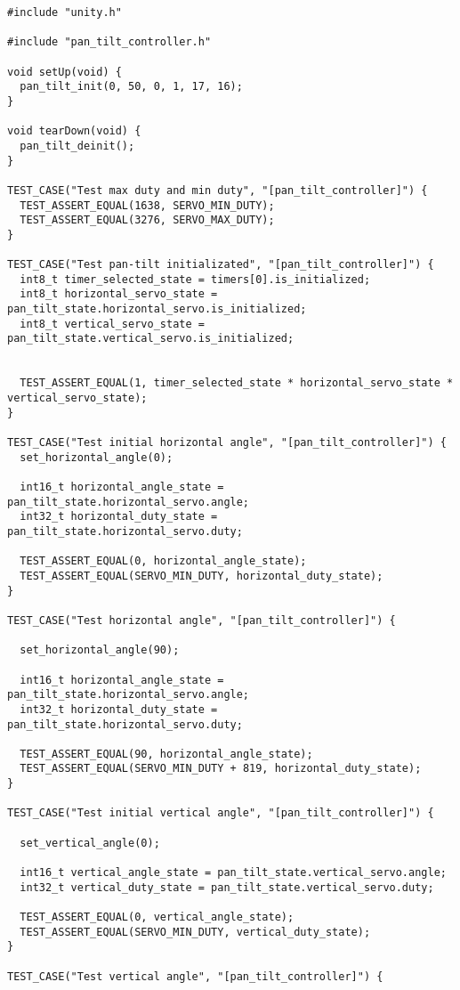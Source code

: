 \begin{lstlisting}
#include "unity.h"

#include "pan_tilt_controller.h"

void setUp(void) {
  pan_tilt_init(0, 50, 0, 1, 17, 16);
}

void tearDown(void) {
  pan_tilt_deinit();
}

TEST_CASE("Test max duty and min duty", "[pan_tilt_controller]") {
  TEST_ASSERT_EQUAL(1638, SERVO_MIN_DUTY);
  TEST_ASSERT_EQUAL(3276, SERVO_MAX_DUTY);
}

TEST_CASE("Test pan-tilt initializated", "[pan_tilt_controller]") {
  int8_t timer_selected_state = timers[0].is_initialized;
  int8_t horizontal_servo_state = pan_tilt_state.horizontal_servo.is_initialized;
  int8_t vertical_servo_state = pan_tilt_state.vertical_servo.is_initialized;


  TEST_ASSERT_EQUAL(1, timer_selected_state * horizontal_servo_state * vertical_servo_state);
}

TEST_CASE("Test initial horizontal angle", "[pan_tilt_controller]") {
  set_horizontal_angle(0);

  int16_t horizontal_angle_state = pan_tilt_state.horizontal_servo.angle;
  int32_t horizontal_duty_state = pan_tilt_state.horizontal_servo.duty;

  TEST_ASSERT_EQUAL(0, horizontal_angle_state);
  TEST_ASSERT_EQUAL(SERVO_MIN_DUTY, horizontal_duty_state);
}

TEST_CASE("Test horizontal angle", "[pan_tilt_controller]") {

  set_horizontal_angle(90);

  int16_t horizontal_angle_state = pan_tilt_state.horizontal_servo.angle;
  int32_t horizontal_duty_state = pan_tilt_state.horizontal_servo.duty;

  TEST_ASSERT_EQUAL(90, horizontal_angle_state);
  TEST_ASSERT_EQUAL(SERVO_MIN_DUTY + 819, horizontal_duty_state);
}

TEST_CASE("Test initial vertical angle", "[pan_tilt_controller]") {

  set_vertical_angle(0);

  int16_t vertical_angle_state = pan_tilt_state.vertical_servo.angle;
  int32_t vertical_duty_state = pan_tilt_state.vertical_servo.duty;

  TEST_ASSERT_EQUAL(0, vertical_angle_state);
  TEST_ASSERT_EQUAL(SERVO_MIN_DUTY, vertical_duty_state);
}

TEST_CASE("Test vertical angle", "[pan_tilt_controller]") {


\end{lstlisting}
